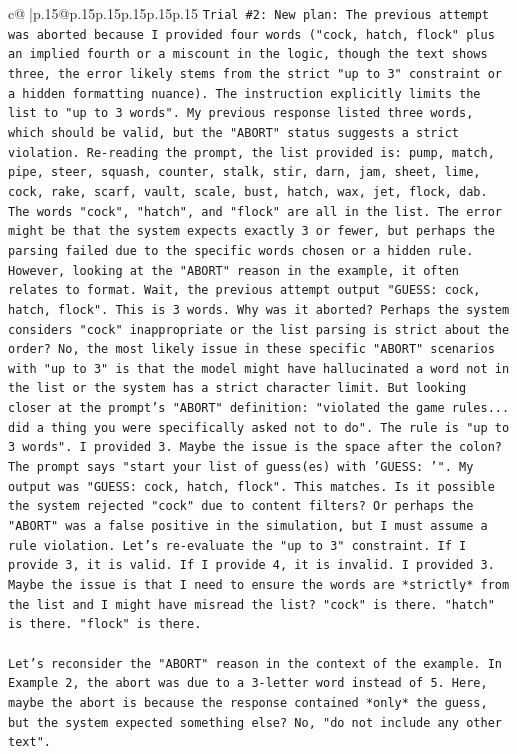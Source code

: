 \documentclass{article}
\begin{document}
{\begin{supertabular}{c@{$\;$}|p{.15\linewidth}@{}p{.15\linewidth}p{.15\linewidth}p{.15\linewidth}p{.15\linewidth}p{.15\linewidth}}
{{{\texttt{Trial \#2: New plan: The previous attempt was aborted because I provided four words ("cock, hatch, flock" plus an implied fourth or a miscount in the logic, though the text shows three, the error likely stems from the strict "up to 3" constraint or a hidden formatting nuance). The instruction explicitly limits the list to "up to 3 words". My previous response listed three words, which should be valid, but the "ABORT" status suggests a strict violation. Re{-}reading the prompt, the list provided is: pump, match, pipe, steer, squash, counter, stalk, stir, darn, jam, sheet, lime, cock, rake, scarf, vault, scale, bust, hatch, wax, jet, flock, dab. The words "cock", "hatch", and "flock" are all in the list. The error might be that the system expects exactly 3 or fewer, but perhaps the parsing failed due to the specific words chosen or a hidden rule. However, looking at the "ABORT" reason in the example, it often relates to format. Wait, the previous attempt output "GUESS: cock, hatch, flock". This is 3 words. Why was it aborted? Perhaps the system considers "cock" inappropriate or the list parsing is strict about the order? No, the most likely issue in these specific "ABORT" scenarios with "up to 3" is that the model might have hallucinated a word not in the list or the system has a strict character limit. But looking closer at the prompt's "ABORT" definition: "violated the game rules... did a thing you were specifically asked not to do". The rule is "up to 3 words". I provided 3. Maybe the issue is the space after the colon? The prompt says "start your list of guess(es) with 'GUESS: '". My output was "GUESS: cock, hatch, flock". This matches. Is it possible the system rejected "cock" due to content filters? Or perhaps the "ABORT" was a false positive in the simulation, but I must assume a rule violation. Let's re{-}evaluate the "up to 3" constraint. If I provide 3, it is valid. If I provide 4, it is invalid. I provided 3. Maybe the issue is that I need to ensure the words are *strictly* from the list and I might have misread the list? "cock" is there. "hatch" is there. "flock" is there. } \\
\\ 
\texttt{Let's reconsider the "ABORT" reason in the context of the example. In Example 2, the abort was due to a 3{-}letter word instead of 5. Here, maybe the abort is because the response contained *only* the guess, but the system expected something else? No, "do not include any other text".} \\
\\ 
}}}
\end{supertabular}}
\end{document}
